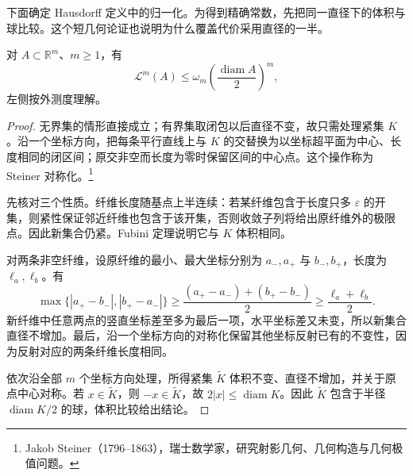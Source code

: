 下面确定 Hausdorff 定义中的归一化。为得到精确常数，先把同一直径下的体积与球比较。这个短几何论证也说明为什么覆盖代价采用直径的一半。

\begin{lemma}\label{g3:lem:euclidean-isodiametric}
	对 \(A\subset\mathbb R^m\)、\(m\ge1\)，有
	\[
		\mathcal L^m(A)\le\omega_m\left(\frac{\operatorname{diam}A}{2}\right)^m,
	\]
	左侧按外测度理解。
\end{lemma}
\begin{proof}
	无界集的情形直接成立；有界集取闭包以后直径不变，故只需处理紧集 \(K\)。沿一个坐标方向，把每条平行直线上与 \(K\) 的交替换为以坐标超平面为中心、长度相同的闭区间；原交非空而长度为零时保留区间的中心点。这个操作称为 Steiner 对称化。\footnote{Jakob Steiner（1796--1863），瑞士数学家，研究射影几何、几何构造与几何极值问题。}

	先核对三个性质。纤维长度随基点上半连续：若某纤维包含于长度只多 \(\varepsilon\) 的开集，则紧性保证邻近纤维也包含于该开集，否则收敛子列将给出原纤维外的极限点。因此新集合仍紧。Fubini 定理说明它与 \(K\) 体积相同。

	对两条非空纤维，设原纤维的最小、最大坐标分别为 \(a_-,a_+\) 与 \(b_-,b_+\)，长度为 \(\ell_a,\ell_b\)。有
	\[
		\max\{|a_+-b_-|,|b_+-a_-|\}
		\ge\frac{(a_+-a_-)+(b_+-b_-)}2
		\ge\frac{\ell_a+\ell_b}2.
	\]
	新纤维中任意两点的竖直坐标差至多为最后一项，水平坐标差又未变，所以新集合直径不增加。最后，沿一个坐标方向的对称化保留其他坐标反射已有的不变性，因为反射对应的两条纤维长度相同。

	依次沿全部 \(m\) 个坐标方向处理，所得紧集 \(\widetilde K\) 体积不变、直径不增加，并关于原点中心对称。若 \(x\in\widetilde K\)，则 \(-x\in\widetilde K\)，故 \(2|x|\le\operatorname{diam}K\)。因此 \(\widetilde K\) 包含于半径 \(\operatorname{diam}K/2\) 的球，体积比较给出结论。
\end{proof}

